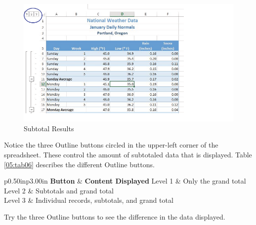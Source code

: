 \begin{figure}[H]
	\centering
	\includegraphics[width=\maxwidth{.95\linewidth}]{gfx/ch05_fig25}
	\caption{Subtotal Results}
	\label{05:fig25}
\end{figure}

Notice the three Outline buttons circled in the upper-left corner of the spreadsheet. These control the amount of subtotaled data that is displayed. Table \ref{05:tab06} describes the different Outline buttons.

\begin{table}[H]
	{\small		
		\begin{longtable}{p{0.50in}p{3.00in}} %
			\textbf{Button} & \textbf{Content Displayed} \endhead
			\hline
			Level 1 & Only the grand total\\
			Level 2 & Subtotals and grand total\\
			Level 3 & Individual records, subtotals, and grand total\\
			\caption{Subtotal Outline Buttons}
			\label{05:tab06}
		\end{longtable}
	}
\end{table}

Try the three Outline buttons to see the difference in the data displayed.

